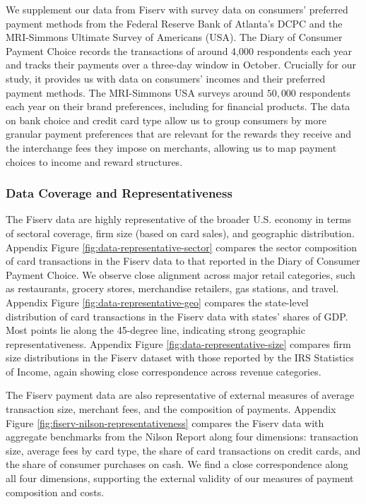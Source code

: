 \documentclass[main.tex]{subfiles}
\begin{document}
We supplement our data from Fiserv with survey data on consumers' preferred payment methods from the Federal Reserve Bank of Atlanta's DCPC and the MRI-Simmons Ultimate Survey of Americans (USA).
The Diary of Consumer Payment Choice records the transactions of around 4,000 respondents each year and tracks their payments over a three-day window in October.
Crucially for our study, it provides us with data on consumers' incomes and their preferred payment methods.
The MRI-Simmons USA surveys around $50,000$ respondents each year on their brand preferences, including for financial products.
The data on bank choice and credit card type allow us to group consumers by more granular payment preferences that are relevant for the rewards they receive and the interchange fees they impose on merchants, allowing us to map payment choices to income and reward structures.

\subsubsection{Data Coverage and Representativeness}

The Fiserv data are highly representative of the broader U.S. economy in terms of sectoral coverage, firm size (based on card sales), and geographic distribution.
Appendix Figure \ref{fig:data-representative-sector} compares the sector composition of card transactions in the Fiserv data to that reported in the Diary of Consumer Payment Choice.
We observe close alignment across major retail categories, such as restaurants, grocery stores, merchandise retailers, gas stations, and travel.
Appendix Figure \ref{fig:data-representative-geo} compares the state-level distribution of card transactions in the Fiserv data with states' shares of GDP.
Most points lie along the 45-degree line, indicating strong geographic representativeness.
Appendix Figure \ref{fig:data-representative-size} compares firm size distributions in the Fiserv dataset with those reported by the IRS Statistics of Income, again showing close correspondence across revenue categories.

The Fiserv payment data are also representative of external measures of average transaction size, merchant fees, and the composition of payments.
Appendix Figure \ref{fig:fiserv-nilson-representativeness} compares the Fiserv data with aggregate benchmarks from the Nilson Report along four dimensions: transaction size, average fees by card type, the share of card transactions on credit cards, and the share of consumer purchases on cash.
We find a close correspondence along all four dimensions, supporting the external validity of our measures of payment composition and costs.
\end{document}
